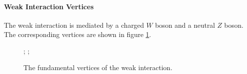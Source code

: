 \paragraph{Weak Interaction Vertices}
The weak interaction is mediated by a charged $W$ boson and a neutral $Z$ boson. The corresponding vertices are shown in figure \ref{fig:weak_verts}.

\begin{figure}[!ht]
	\centering
	;
	;
	\caption{The fundamental vertices of the weak interaction.}
	\label{fig:weak_verts}
\end{figure}


